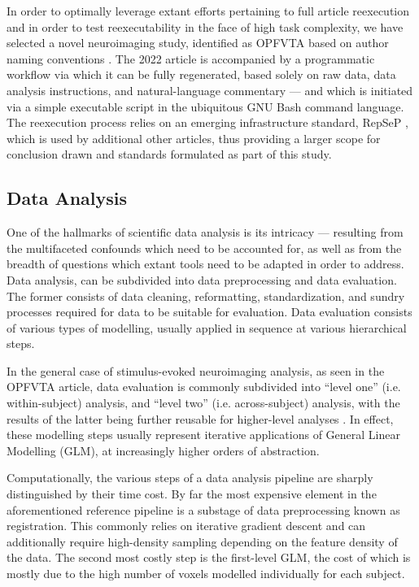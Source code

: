 In order to optimally leverage extant efforts pertaining to full article reexecution and in order to test reexecutability in the face of high task complexity, we have selected a novel neuroimaging study, identified as OPFVTA based on author naming conventions \supercite{opfvta}.
The 2022 article is accompanied by a programmatic workflow via which it can be fully regenerated, based solely on raw data, data analysis instructions, and natural-language commentary — and which is initiated via a simple executable script in the ubiquitous GNU Bash \supercite{bash} command language.
The reexecution process relies on an emerging infrastructure standard, RepSeP \supercite{repsep}, which is used by additional other articles, thus providing a larger scope for conclusion drawn and standards formulated as part of this study.


\subsection{Data Analysis}

One of the hallmarks of scientific data analysis is its intricacy — resulting from the multifaceted confounds which need to be accounted for, as well as from the breadth of questions which extant tools need to be adapted in order to address.
Data analysis, can be subdivided into data preprocessing and data evaluation.
The former consists of data cleaning, reformatting, standardization, and sundry processes required for data to be suitable for evaluation.
Data evaluation consists of various types of modelling, usually applied in sequence at various hierarchical steps.

In the general case of stimulus-evoked neuroimaging analysis, as seen in the OPFVTA article, data evaluation is commonly subdivided into “level one” (i.e. within-subject) analysis, and “level two” (i.e. across-subject) analysis, with the results of the latter being further reusable for higher-level analyses \supercite{Friston1995}.
In effect, these modelling steps usually represent iterative applications of General Linear Modelling (GLM), at increasingly higher orders of abstraction.

Computationally, the various steps of a data analysis pipeline are sharply distinguished by their time cost.
By far the most expensive element in the aforementioned reference pipeline is a substage of data preprocessing known as registration.
This commonly relies on iterative gradient descent and can additionally require high-density sampling depending on the feature density of the data.
The second most costly step is the first-level GLM, the cost of which is mostly due to the high number of voxels modelled individually for each subject.

